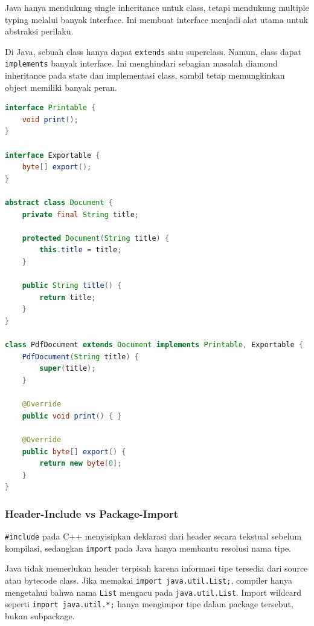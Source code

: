 \begin{jawab}
Java hanya mendukung single inheritance untuk class, tetapi mendukung multiple typing melalui banyak interface. Ini membuat interface menjadi alat utama untuk abstraksi perilaku.
\end{jawab}

Di Java, sebuah class hanya dapat \texttt{extends} satu superclass. Namun, class dapat \texttt{implements} banyak interface. Ini menghindari sebagian masalah diamond inheritance pada state dan implementasi class, sambil tetap memungkinkan object memiliki banyak peran.

\begin{lstlisting}[language=Java, caption={Single class inheritance dan multiple interface implementation}, label={lst:java-extends-implements}]
interface Printable {
    void print();
}

interface Exportable {
    byte[] export();
}

abstract class Document {
    private final String title;

    protected Document(String title) {
        this.title = title;
    }

    public String title() {
        return title;
    }
}

class PdfDocument extends Document implements Printable, Exportable {
    PdfDocument(String title) {
        super(title);
    }

    @Override
    public void print() { }

    @Override
    public byte[] export() {
        return new byte[0];
    }
}
\end{lstlisting}

\subsubsection{Header-Include vs Package-Import}

\begin{jawab}
\texttt{\#include} pada C++ menyisipkan deklarasi dari header secara tekstual sebelum kompilasi, sedangkan \texttt{import} pada Java hanya membantu resolusi nama tipe.
\end{jawab}

Java tidak memerlukan header terpisah karena informasi tipe tersedia dari source atau bytecode class. Jika memakai \texttt{import java.util.List;}, compiler hanya mengetahui bahwa nama \texttt{List} mengacu pada \texttt{java.util.List}. Import wildcard seperti \texttt{import java.util.*;} hanya mengimpor tipe dalam package tersebut, bukan subpackage.

